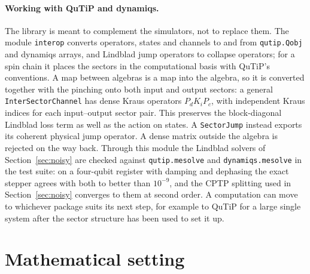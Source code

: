 \documentclass[11pt]{article}
\begin{document}
\paragraph{Working with QuTiP and dynamiqs.} The library is meant to complement the simulators, not to replace them.
The module \texttt{interop} converts operators, states and channels to and from \texttt{qutip.Qobj} and dynamiqs
arrays, and Lindblad jump operators to collapse operators; for a spin chain it places the sectors in the computational basis with
QuTiP's conventions. A map between algebras is a map into the algebra, so it is converted together with the pinching
onto both input and output sectors: a general \texttt{InterSectorChannel} has dense Kraus operators $P_dK_iP_c$,
with independent Kraus indices for each input--output sector pair. This preserves the block-diagonal Lindblad loss
term as well as the action on states. A \texttt{SectorJump} instead exports its coherent physical jump operator.
A dense matrix outside the algebra is rejected on the way back. Through this module the
Lindblad solvers of Section~\ref{sec:noisy} are checked against \texttt{qutip.mesolve} and \texttt{dynamiqs.mesolve}
in the test suite: on a four-qubit register with damping and dephasing the exact stepper agrees with both to better than
$10^{-9}$, and the CPTP splitting used in Section~\ref{sec:noisy} converges to them at second order. A computation
can move to whichever package suits its next step, for example to QuTiP for a large single system after the sector
structure has been used to set it up.

\section{Mathematical setting}\label{sec:math}
\end{document}
